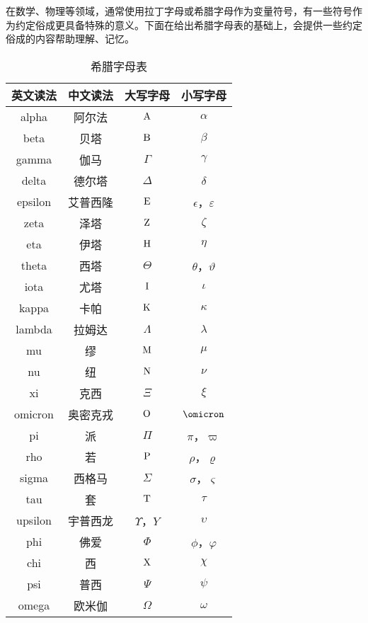 \begin{issues}
\issueDraft
\end{issues}
在数学、物理等领域，通常使用拉丁字母或希腊字母作为变量符号，有一些符号作为约定俗成更具备特殊的意义。下面在给出希腊字母表的基础上，会提供一些约定俗成的内容帮助理解、记忆。

\begin{table}[ht]
\centering
\caption{希腊字母表}\label{tab_GreekL1}
\begin{tabular}{|c|c|c|c|}
\hline
英文读法 & 中文读法 & 大写字母 & 小写字母 \\
\hline
alpha & 阿尔法 & ${\rm A}$ & $\alpha$ \\
\hline
beta & 贝塔 & ${\rm B}$ & $\beta$ \\
\hline
gamma & 伽马 & $\Gamma$ & $\gamma$ \\
\hline
delta & 德尔塔 &$\Delta$ & $\delta$ \\
\hline
epsilon & 艾普西隆 & ${\rm E}$ & $\epsilon$，$\varepsilon$ \\
\hline
zeta & 泽塔 & ${\rm Z}$ & $\zeta$ \\
\hline
eta & 伊塔 & ${\rm H}$ & $\eta$ \\
\hline
theta & 西塔 & $\Theta$ & $\theta$，$\vartheta$ \\
\hline
iota & 尤塔 & ${\rm I}$ & $\iota$ \\
\hline
kappa & 卡帕 & ${\rm K}$ & $\kappa$ \\
\hline
lambda & 拉姆达 &$\Lambda$ & $\lambda$ \\
\hline
mu & 缪 & ${\rm M}$ & $\mu$ \\
\hline
nu & 纽 & ${\rm N}$ & $\nu$ \\
\hline
xi & 克西 &$\Xi$ & $\xi$ \\
\hline
omicron & 奥密克戎 & ${\rm O}$ & $\omicron$ \\
\hline
pi & 派 &$\Pi$ & $\pi$，$\varpi$ \\
\hline
rho & 若 & ${\rm P}$ & $\rho$，$\varrho$ \\
\hline
sigma & 西格马 &$\Sigma$ & $\sigma$，$\varsigma$ \\
\hline
tau & 套 & ${\rm T}$ & $\tau$ \\
\hline
upsilon & 宇普西龙 & $\Upsilon$，${Y}$ & $\upsilon$ \\
\hline
phi & 佛爱 &$\Phi$ & $\phi$，$\varphi$ \\
\hline
chi & 西 & ${\rm X}$ & $\chi$ \\
\hline
psi & 普西&$\Psi$ & $\psi$ \\
\hline
omega & 欧米伽&$\Omega$ & $\omega$ \\
\hline
\end{tabular}
\end{table}




